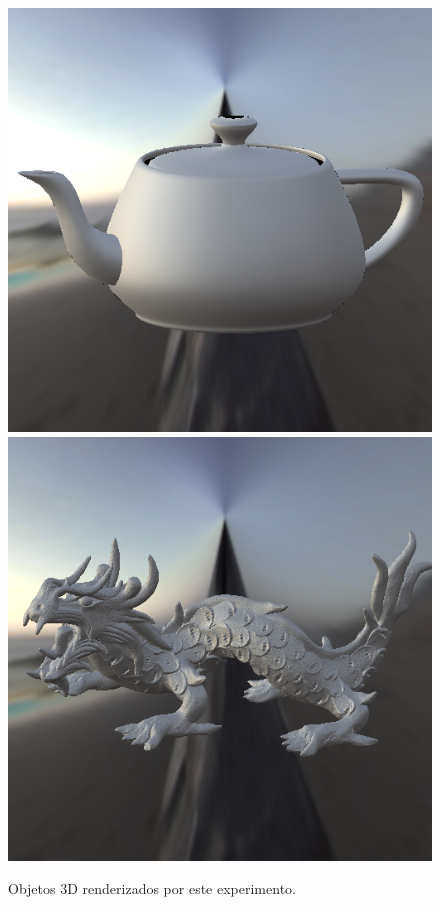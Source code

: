 \begin{figure}[H]
    \caption{\small{Objetos 3D renderizados por este experimento.}}\label{fig-ward-objetcs}
  \includegraphics[width=\linewidth]{./Imagens/brdfs/ward-teapot.png}
\endminipage\hfill
{}
  \includegraphics[width=\linewidth]{./Imagens/brdfs/ward-dragon.png}

\end{figure}

